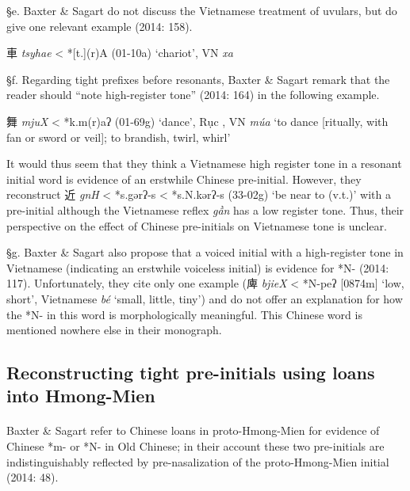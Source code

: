 §e. Baxter \& Sagart do not discuss the Vietnamese treatment of uvulars,
but do give one relevant example (2014: 158).

\begin{description} \item
車 \emph{tsyhae} \textless{} *[t.{}](r)A (01-10a) `chariot', VN
 \emph{xa}
\end{description}

§f. Regarding tight prefixes before resonants, Baxter \& Sagart remark
that the reader should ``note high-register tone'' (2014: 164) in the
following example.

\begin{description} \item
舞 \emph{mjuX} \textless{} *k.m(r)aʔ (01-69g) `dance', Rục \emph{},
VN \emph{múa} `to dance {[}ritually, with fan or sword or veil]; to
brandish, twirl, whirl'
\end{description}

It would thus seem that they think a Vietnamese high register tone in a
resonant initial word is evidence of an erstwhile Chinese pre-initial.
However, they reconstruct 近 \emph{g{}nH} \textless{} *s.gərʔ-s
\textless{} *s.N.kərʔ-s (33-02g) `be near to (v.t.)' with a pre-initial
although the Vietnamese reflex \emph{gần} has a low register tone. Thus,
their perspective on the effect of Chinese pre-initials on Vietnamese
tone is unclear.

§g. Baxter \& Sagart also propose that a voiced initial with a
high-register tone in Vietnamese (indicating an erstwhile voiceless
initial) is evidence for *N- (2014: 117). Unfortunately, they cite only
one example (庳 \emph{bjieX} \textless{} *N-peʔ {[}0874m] `low,
short', Vietnamese \emph{bé} `small, little, tiny') and do not offer an
explanation for how the *N- in this word is morphologically meaningful.
This Chinese word is mentioned nowhere else in their monograph.

\subsection{Reconstructing tight pre-initials using loans into
Hmong-Mien}\label{reconstructing-tight-pre-initials-using-loans-into-hmong-mien}

\paragraph{}Baxter \& Sagart refer to Chinese loans in proto-Hmong-Mien for
evidence of Chinese *m- or *N- in Old Chinese; in their account these
two pre-initials are indistinguishably reflected by pre-nasalization of
the proto-Hmong-Mien initial (2014: 48).

